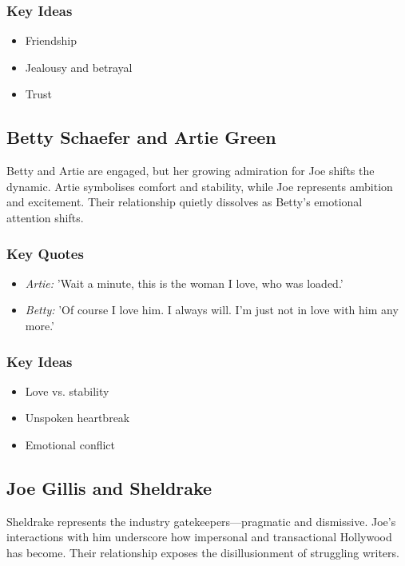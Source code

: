 \documentclass[a4paper]{article}
\begin{document}
\subsubsection*{Key Ideas}
\begin{itemize}
    \item Friendship
    \item Jealousy and betrayal
    \item Trust
\end{itemize}

\subsection{Betty Schaefer and Artie Green}
Betty and Artie are engaged, but her growing admiration for Joe shifts the dynamic. Artie symbolises comfort and stability, while Joe represents ambition and excitement. Their relationship quietly dissolves as Betty’s emotional attention shifts.

\subsubsection*{Key Quotes}
\begin{itemize}
    \item \textit{Artie:} 'Wait a minute, this is the woman I love, who was loaded.'
    \item \textit{Betty:} 'Of course I love him. I always will. I'm just not in love with him any more.'
\end{itemize}

\subsubsection*{Key Ideas}
\begin{itemize}
    \item Love vs. stability
    \item Unspoken heartbreak
    \item Emotional conflict
\end{itemize}

\subsection{Joe Gillis and Sheldrake}
Sheldrake represents the industry gatekeepers—pragmatic and dismissive. Joe’s interactions with him underscore how impersonal and transactional Hollywood has become. Their relationship exposes the disillusionment of struggling writers.
\end{document}
